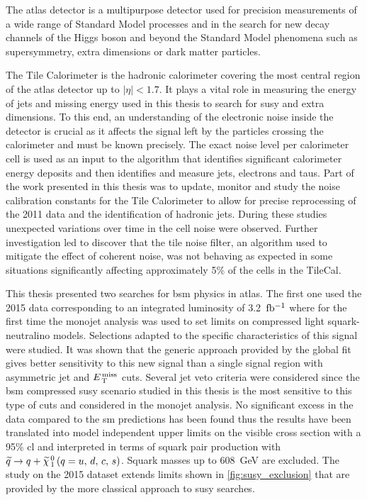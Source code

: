 The \gls{atlas} detector is a multipurpose detector used for precision
measurements of a wide range of Standard Model processes and in the search for
new decay channels of the Higgs boson and beyond the Standard Model phenomena
such as supersymmetry, extra dimensions or dark matter particles.

The Tile Calorimeter is the hadronic calorimeter covering the most central
region of the \gls{atlas} detector up to $|\eta| < 1.7$. It plays a vital role
in measuring the energy of jets and missing energy used in this thesis to search
for \gls{susy} and extra dimensions. To this end, an understanding of the
electronic noise inside the detector is crucial as it affects the signal left by
the particles crossing the calorimeter and must be known precisely. The exact
noise level per calorimeter cell is used as an input to the algorithm that
identifies significant calorimeter energy deposits and then identifies and
measure jets, electrons and taus. Part of the work presented in this thesis was
to update, monitor and study the noise calibration constants for the Tile
Calorimeter to allow for precise reprocessing of the 2011 data and the
identification of hadronic jets. During these studies unexpected variations over
time in the cell noise were observed. Further investigation led to discover that
the tile noise filter, an algorithm used to mitigate the effect of coherent
noise, was not behaving as expected in some situations significantly affecting
approximately 5\% of the cells in the TileCal.

This thesis presented two searches for \gls{bsm} physics in \gls{atlas}. The
first one used the 2015 data corresponding to an integrated luminosity of
3.2~$\mbox{fb$^{-1}$}$ where for the first time the monojet analysis was used to set limits
on compressed light squark-neutralino models. Selections adapted to the specific
characteristics of this signal were studied. It was shown that the generic
approach provided by the global fit gives better sensitivity to this new signal
than a single signal region with asymmetric jet and $E_\mathrm{\, T}^\mathrm{\, miss}$ cuts. Several jet
veto criteria were considered since the \gls{bsm} compressed \gls{susy} scenario
studied in this thesis is the most sensitive to this type of cuts and considered
in the monojet analysis. No significant excess in the data compared to the
\gls{sm} predictions has been found thus the results have been translated into
model independent upper limits on the visible cross section with a 95\% \gls{cl}
and interpreted in terms of squark pair production with $\widetilde{q} \rightarrow q + \widetilde{\chi}_{\, 1}^{\, 0}\, (q = u,\, d,\, c,\, s)$. Squark
masses up to 608~GeV are excluded. The study on the 2015 dataset extends limits
shown in \cref{fig:susy_exclusion} that are provided by the more classical
approach to \gls{susy} searches.

